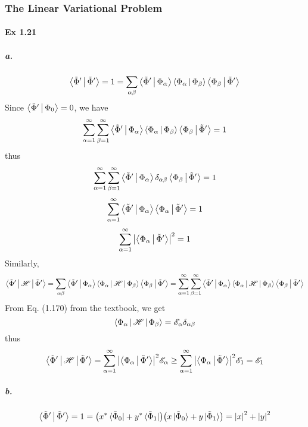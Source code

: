 \documentclass[a4paper]{article}
\newcommand{\ex}[1]{\paragraph{Ex #1}}
\newcommand{\subex}[1]{\subparagraph{#1}}
\newcommand{\tPhi}{\tilde{\Phi} }
\numberwithin{equation}{subsection}
\begin{document}
\subsubsection{The Linear Variational Problem}
\ex{1.21}
\subex{a.}
\begin{equation}\label{key}
\Braket{\tPhi' | \tPhi'} = 1 = \sum_{\alpha\beta} \Braket{\tPhi' | \Phi_\alpha} \Braket{\Phi_\alpha | \Phi_\beta} \Braket{\Phi_\beta | \tPhi'}
\end{equation}
Since $ \Braket{\tPhi' | \Phi_0} = 0 $, we have
\begin{equation}\label{key}
\sum_{\alpha=1}^\infty \sum_{\beta=1}^\infty \Braket{\tPhi' | \Phi_\alpha} \Braket{\Phi_\alpha | \Phi_\beta} \Braket{\Phi_\beta | \tPhi'} = 1
\end{equation}
thus
\begin{equation}\label{key}
\sum_{\alpha=1}^\infty \sum_{\beta=1}^\infty \Braket{\tPhi' | \Phi_\alpha} \delta_{\alpha\beta} \Braket{\Phi_\beta | \tPhi'} = 1
\end{equation}
\begin{equation}\label{key}
\sum_{\alpha=1}^\infty \Braket{\tPhi' | \Phi_\alpha} \Braket{\Phi_\alpha | \tPhi'} = 1
\end{equation}
\begin{equation}\label{key}
\sum_{\alpha=1}^\infty \abs{\Braket{\Phi_\alpha | \tPhi'}}^2 = 1
\end{equation}
Similarly,
\begin{equation}\label{key}
\Braket{\tPhi' | \mathscr{H} | \tPhi'} = \sum_{\alpha\beta} \Braket{\tPhi' | \Phi_\alpha} \Braket{\Phi_\alpha | \mathscr{H} | \Phi_\beta} \Braket{\Phi_\beta | \tPhi'} = \sum_{\alpha=1}^\infty \sum_{\beta=1}^\infty \Braket{\tPhi' | \Phi_\alpha} \Braket{\Phi_\alpha | \mathscr{H} | \Phi_\beta} \Braket{\Phi_\beta | \tPhi'}
\end{equation}
From Eq. (1.170) from the textbook, we get
\begin{equation}\label{key}
\Braket{\Phi_\alpha | \mathscr{H} | \Phi_\beta} = \mathscr{E}_\alpha \delta_{\alpha\beta}
\end{equation}
thus
\begin{equation}\label{key}
\Braket{\tPhi' | \mathscr{H} | \tPhi'} =\sum_{\alpha=1}^\infty \abs{\Braket{\Phi_\alpha | \tPhi'}}^2 \mathscr{E}_\alpha \geq \sum_{\alpha=1}^\infty \abs{\Braket{\Phi_\alpha | \tPhi'}}^2 \mathscr{E}_1 = \mathscr{E}_1
\end{equation}
\subex{b.}
\begin{equation}\label{key}
\Braket{\tPhi' | \tPhi'} = 1 = \qty(x^* \bra{\tPhi_0} + y^*\bra{\tPhi_1}) \qty(x\ket{\tPhi_0} + y\ket{\tPhi_1}) = \abs{x}^2 + \abs{y}^2
\end{equation}
\end{document}
